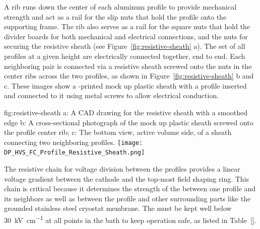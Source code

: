 A rib runs down the center of each aluminum profile to provide mechanical strength and act as a rail for the slip nuts that hold the profile onto the supporting  frame. The rib also serves as a rail for the square nuts that hold the  divider boards for both mechanical and electrical connections, and the nuts for securing the resistive sheath (see  Figure~\ref{fig:resistive-sheath} a). 
The set of all profiles at a given height are electrically connected together, end to end. Each neighboring pair is connected via a resistive sheath screwed onto the nuts in the center ribs across the two profiles, as shown in Figure~\ref{fig:resistive-sheath} b and c. These images show a \threed{}-printed mock up plastic sheath with a profile inserted and connected to it using metal screws to allow  electrical conduction. 

\begin{dunefigure}{fig:resistive-sheath}
{a: A CAD drawing for the resistive sheath with a smoothed edge b: A cross-sectional photograph of the mock up plastic sheath screwed onto the profile center rib; c: The bottom view, active volume side, of a sheath connecting two neighboring profiles.} 
\texttt{[image: DP\_HVS\_FC\_Profile\_Resistive\_Sheath.png]}
\end{dunefigure}

The resistive chain for voltage division between the profiles provides a linear voltage gradient between the cathode and the top-most field shaping ring. This chain is critical because it determines the strength of the \efield between one profile and its neighbors as well as between the profile and other surrounding parts like the grounded stainless steel cryostat membrane. 
The \efield must be kept well below \SI{30}{\kV\per\cm} at all points in the \lar bath to keep  operation safe, as listed in Table~\ref{}. %

